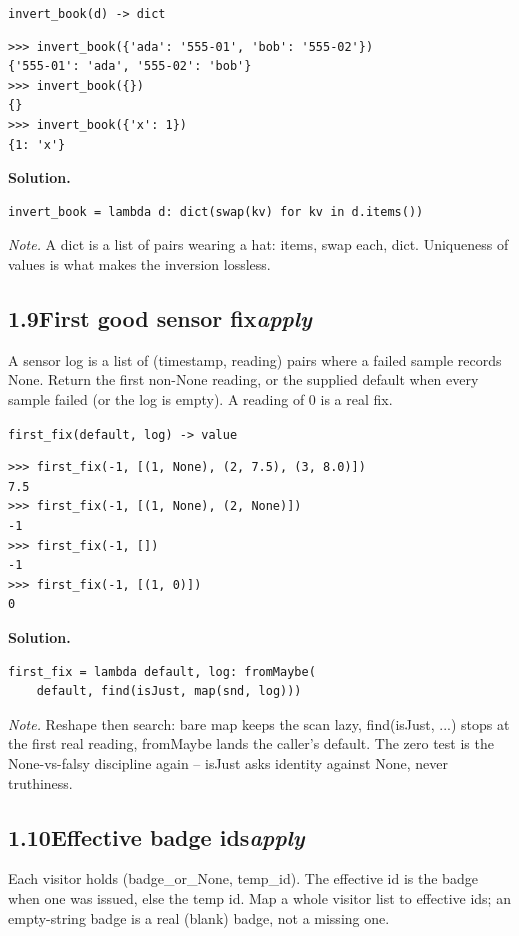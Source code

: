 \documentclass[10pt,letterpaper]{book}
\begin{document}
\noindent\texttt{invert\_book(d) -> dict}
\begin{lstlisting}[style=ex]
>>> invert_book({'ada': '555-01', 'bob': '555-02'})
{'555-01': 'ada', '555-02': 'bob'}
>>> invert_book({})
{}
>>> invert_book({'x': 1})
{1: 'x'}
\end{lstlisting}
\noindent\textbf{Solution.}
\begin{lstlisting}[style=code]
invert_book = lambda d: dict(swap(kv) for kv in d.items())
\end{lstlisting}
\noindent\textit{Note.} A dict is a list of pairs wearing a hat: items, swap each, dict. Uniqueness of values is what makes the inversion lossless.

\subsection*{1.9\quad First good sensor fix\hfill\textnormal{\textit{apply}}}
A sensor log is a list of (timestamp, reading) pairs where a failed sample records None. Return the first non-None reading, or the supplied default when every sample failed (or the log is empty). A reading of 0 is a real fix.

\noindent\texttt{first\_fix(default, log) -> value}
\begin{lstlisting}[style=ex]
>>> first_fix(-1, [(1, None), (2, 7.5), (3, 8.0)])
7.5
>>> first_fix(-1, [(1, None), (2, None)])
-1
>>> first_fix(-1, [])
-1
>>> first_fix(-1, [(1, 0)])
0
\end{lstlisting}
\noindent\textbf{Solution.}
\begin{lstlisting}[style=code]
first_fix = lambda default, log: fromMaybe(
    default, find(isJust, map(snd, log)))
\end{lstlisting}
\noindent\textit{Note.} Reshape then search: bare map keeps the scan lazy, find(isJust, ...) stops at the first real reading, fromMaybe lands the caller's default. The zero test is the None-vs-falsy discipline again -- isJust asks identity against None, never truthiness.


\subsection*{1.10\quad Effective badge ids\hfill\textnormal{\textit{apply}}}
Each visitor holds (badge\_or\_None, temp\_id). The effective id is the badge when one was issued, else the temp id. Map a whole visitor list to effective ids; an empty-string badge is a real (blank) badge, not a missing one.
\end{document}
